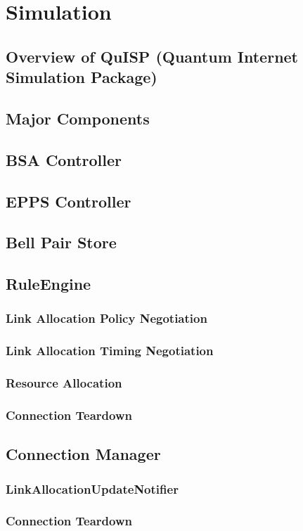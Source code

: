 \chapter{Simulation}
\label{simulation}

\section{Overview of QuISP (Quantum Internet Simulation Package)}
\section{Major Components}

\section{BSA Controller}
\section{EPPS Controller}
\section{Bell Pair Store}

\section{RuleEngine}
\subsection{Link Allocation Policy Negotiation}
\subsection{Link Allocation Timing Negotiation}
\subsection{Resource Allocation}
\subsection{Connection Teardown}

\section{Connection Manager}
\subsection{LinkAllocationUpdateNotifier}
\subsection{Connection Teardown}



